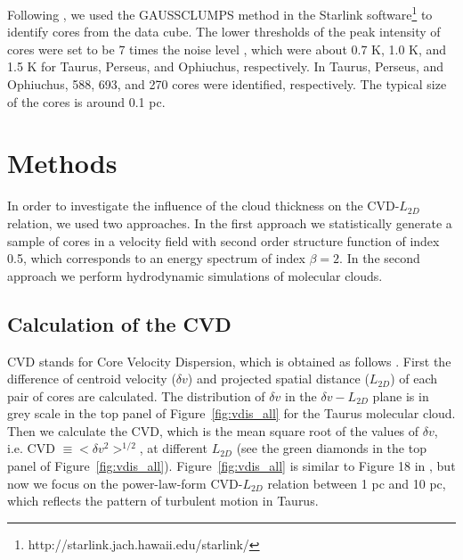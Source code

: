 \documentclass[iop,revtex4]{emulateapj}
\begin{document}
Following \citet{Qian2012}, we used the GAUSSCLUMPS method in the Starlink software\footnote{http://starlink.jach.hawaii.edu/starlink/} to identify cores from the data cube. The lower thresholds of the peak intensity of cores were set to be 7 times the noise level \citep[see][]{Qian2012}, which were about 0.7 K, 1.0 K, and 1.5 K for Taurus, Perseus, and Ophiuchus, respectively. In Taurus, Perseus, and Ophiuchus, 588, 693, and 270 cores were identified, respectively. The typical size of the cores is around 0.1 pc.



\section{Methods}
\label{sec:methods}

In order to investigate the influence of the cloud thickness on the CVD-$L_{2D}$ relation, we used two approaches.
In the first approach we statistically generate a sample of cores in a velocity field with second order structure function of index 0.5, which corresponds to an energy spectrum of index $\beta=2$. In the second approach we perform hydrodynamic simulations of molecular clouds.



\subsection{Calculation of the CVD}

CVD stands for Core Velocity Dispersion, which is obtained as follows \citep{Qian2012}. First the difference of centroid velocity ($\delta v$) and projected spatial distance ($L_{2D}$) of each pair of cores are calculated. The distribution of $\delta v$ in the $\delta v - L_{2D}$ plane is in grey scale in the top panel of Figure~\ref{fig:vdis_all} for the Taurus molecular cloud. Then we calculate the CVD, which is the mean square root of the values of $\delta v$, i.e. CVD $\equiv <\delta v^2>^{1/2}$,  at different $L_{2D}$ (see the green diamonds in the top panel of Figure~\ref{fig:vdis_all}). Figure~\ref{fig:vdis_all} is similar to Figure 18 in \cite{Qian2012}, but now we focus on the power-law-form CVD-$L_{2D}$ relation between 1 pc and 10 pc, which reflects the pattern of turbulent motion in Taurus.
\end{document}
